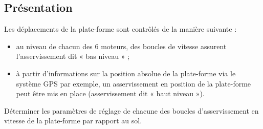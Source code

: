 \begin{multicols}{2}
\setcounter{exo}{0}
\subsection*{Présentation}

Les déplacements de la plate-forme sont contrôlés de la manière suivante :
\begin{itemize}
\item au niveau de chacun des 6 moteurs, des boucles de vitesse assurent l’asservissement dit « bas niveau » ;
\item à partir d’informations sur la position absolue de la plate-forme via le système GPS par exemple, un
asservissement en position de la plate-forme peut être mis en place (asservissement dit « haut niveau »).
\end{itemize}

\begin{obj}
Déterminer les paramètres de réglage de chacune des boucles d’asservissement en vitesse de la plate-forme par rapport au sol.
\end{obj}


\end{multicols}

